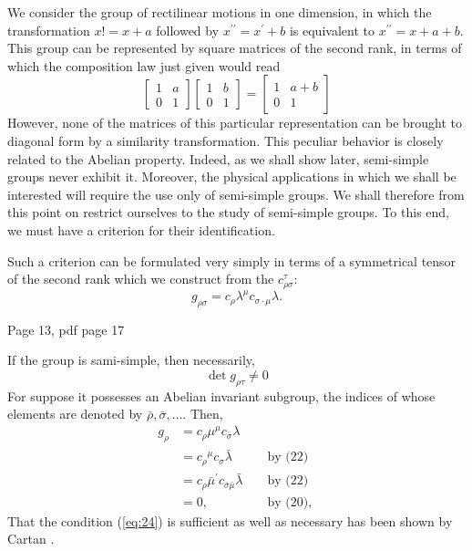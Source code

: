 We consider the group of rectilinear motions in one dimension, in which the transformation \(x!=x+a\) followed by \(x^{\prime \prime}=x^{\prime}+b\) is equivalent to \(x^{\prime \prime}=x+a+b\). This group can be represented by square matrices of the second rank, in terms of which the composition law just given would read
\[
\begin{bmatrix}
1 & a \\
0 & 1
\end{bmatrix}
\begin{bmatrix}
1 & b \\
0 & 1
\end{bmatrix}=
\begin{bmatrix}
1 & a+b \\
0 & 1
\end{bmatrix}
\]
However, none of the matrices of this particular representation can be
brought to diagonal form by a similarity transformation. This peculiar
behavior is closely related to the Abelian property. Indeed, as we shall
show later, semi-simple groups never exhibit it. Moreover, the physical
applications in which we shall be interested will require the use only of
semi-simple groups. We shall therefore from this point on restrict
ourselves to the study of semi-simple groups. To this end, we must have a
criterion for their identification.

Such a criterion can be formulated very simply in terms of a symmetrical
tensor of the second rank which we construct from the
\(c_{\rho \sigma}^\tau\):
\begin{equation}\label{eq:23}
g_{\rho \sigma}=c_\rho \lambda^\mu c_{\sigma \cdot \mu} \lambda .
\end{equation}

Page 13, pdf page 17

If the group is sami-simple, then necessarily,
\begin{equation}\label{eq:24}
\det g_{\rho \tau} \ne  0
\end{equation}
For suppose it possesses an Abelian invariant subgroup, the indices of whose
elements are denoted by \(\bar{\rho}, \bar{\sigma}, \ldots\). Then,
\[
\begin{aligned}
g_\rho & =c_\rho \mu^\mu c_{\bar{\sigma}} \lambda & & \\
& =c_\rho{ }^\mu c_\sigma \bar{\lambda} & & \text { by (22) } \\
& =c_\rho \bar{\mu}^{\prime} c_{\bar{\sigma} \bar{\mu}} \bar{\lambda} & & \text { by (22) } \\
& =0, & & \text { by (20), }
\end{aligned}
\]
That the condition (\ref{eq:24}) is sufficient as well as necessary has been shown by Cartan
.


